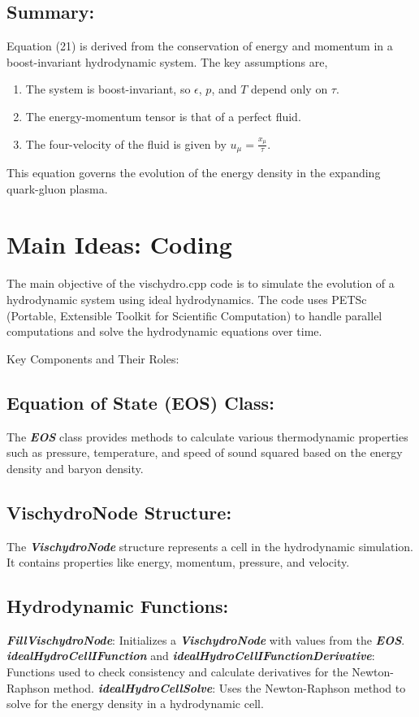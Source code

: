 \documentclass{article}
\begin{document}
\subsection{Summary:}
Equation (21) is derived from the conservation of energy and momentum in a boost-invariant hydrodynamic system. The key assumptions are,
\begin{enumerate}
    \item The system is boost-invariant, so $\epsilon$, $p$, and $T$ depend only on $\tau$.
    \item The energy-momentum tensor is that of a perfect fluid.
    \item The four-velocity of the fluid is given by $u_\mu = \frac{x_\mu}{\tau}$. 
\end{enumerate}
This equation governs the evolution of the energy density in the expanding quark-gluon plasma.

\section{Main Ideas: Coding}
The main objective of the vischydro.cpp code is to simulate the evolution of a hydrodynamic system using ideal hydrodynamics. The code uses PETSc (Portable, Extensible Toolkit for Scientific Computation) to handle parallel computations and solve the hydrodynamic equations over time.

Key Components and Their Roles:
\subsection{Equation of State (EOS) Class:}
The \textbf{\textit{EOS}} class provides methods to calculate various thermodynamic properties such as pressure, temperature, and speed of sound squared based on the energy density and baryon density.

\subsection{VischydroNode Structure:}
The \textit{\textbf{VischydroNode}} structure represents a cell in the hydrodynamic simulation. It contains properties like energy, momentum, pressure, and velocity.

\subsection{Hydrodynamic Functions:}
\textit{\textbf{FillVischydroNode}}: Initializes a \textit{\textbf{VischydroNode}} with values from the \textit{\textbf{EOS}}.
\textbf{\textit{idealHydroCellIFunction}} and \textbf{\textit{idealHydroCellIFunctionDerivative}}: Functions used to check consistency and calculate derivatives for the Newton-Raphson method.
\textbf{\textit{idealHydroCellSolve}}: Uses the Newton-Raphson method to solve for the energy density in a hydrodynamic cell.
\end{document}
